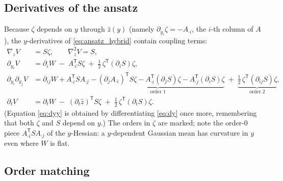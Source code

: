 \documentclass[11pt,a4paper]{article}
\newcommand{\T}{^{\mathsf T}}
\newcommand{\zh}{\hat{z}}
\newcommand{\gz}{\nabla_{\!z}}
\theoremstyle{plain}
\theoremstyle{definition}
\theoremstyle{remark}
\begin{document}
\subsection{Derivatives of the ansatz}

Because $\zeta$ depends on $y$ through $\zh(y)$ (namely $\partial_{y_i}\zeta = -A_{\cdot i}$, the $i$-th column of $A$), the $y$-derivatives of \eqref{eq:ansatz_hybrid} contain coupling terms:
\begin{align}
  \gz V &= S\zeta, \qquad \gz^2 V = S, \label{eq:dz}\\
  \partial_{y_i} V &= \partial_i W \;-\; A_{\cdot i}\T S\zeta \;+\; \tfrac12\,\zeta\T(\partial_i S)\zeta, \label{eq:dy}\\
  \partial_{y_i}\partial_{y_j} V &= \partial_{ij}W + A_{\cdot i}\T S A_{\cdot j}
     \;\underbrace{-\,(\partial_j A_{\cdot i})\T S\zeta - A_{\cdot i}\T(\partial_j S)\zeta - A_{\cdot j}\T(\partial_i S)\zeta}_{\text{order 1}}
     \;+\;\underbrace{\tfrac12\,\zeta\T(\partial_{ij}S)\zeta}_{\text{order 2}}, \label{eq:dyy}\\
  \partial_t V &= \partial_t W \;-\; (\partial_t\zh)\T S\zeta \;+\; \tfrac12\,\zeta\T(\partial_t S)\zeta . \label{eq:dtV}
\end{align}
(Equation \eqref{eq:dyy} is obtained by differentiating \eqref{eq:dy} once more, remembering that both $\zeta$ and $S$ depend on $y$.) The orders in $\zeta$ are marked; note the order-0 piece $A_{\cdot i}\T S A_{\cdot j}$ of the $y$-Hessian: a $y$-dependent Gaussian mean has curvature in $y$ even where $W$ is flat.

\subsection{Order matching}
\end{document}
